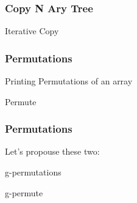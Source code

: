 \documentclass{beamer}
\begin{document}
\begin{frame}
	\frametitle{Copy N Ary Tree}
	\begin{block}{Iterative Copy}
		\begin{algorithmic}[1]
				\State {}
			\EndProcedure
		\end{algorithmic}
	\end{block}
\end{frame}
\begin{frame}
	\frametitle{Permutations}
	\begin{block}{Printing Permutations of an array}
		\tiny
		\begin{algorithmic}[1]
					\State \Return {$[a]$}
				\Else
					\State {}
				\EndIf
			 \EndProcedure
		\end{algorithmic}
	\end{block}
	\begin{block}{Permute}
		\tiny
		\begin{algorithmic}[1]
					\State \Return{$[]$}
				\Else
					\State {}
				\EndIf
			\EndProcedure
		\end{algorithmic}
	\end{block}
\end{frame}
\begin{frame}
	\frametitle{Permutations}
	Let's propouse these two:
	\begin{block}{g-permutations}
		\begin{algorithmic}[1]
				\State {}
			\EndProcedure
		\end{algorithmic}
	\end{block}
	\begin{block}{g-permute}
		\begin{algorithmic}[1]
				\State {}
			\EndProcedure
		\end{algorithmic}
	\end{block}
\end{frame}
\end{document}
